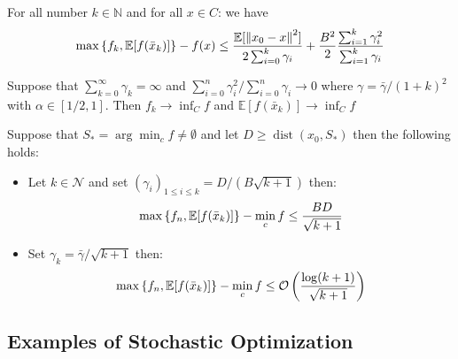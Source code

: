 \begin{theorem}
    For all number $k \in \mathbb{N}$ and for all $x\in C$: we have 
    \begin{equation*}
        \max\left\{ f_k, \mathbb{E}[f(\bar{x}_k)] \right\} - f(x) \le \frac{\mathbb{E}[\left\lVert x_0 - x\right\rVert^2]}{2\sum^k_{i=0}\gamma_i} +\frac{B^2}{2}\frac{\sum^k_{i=1}\gamma_i^2}{\sum^k_{i=1}\gamma_i}
    \end{equation*}
\end{theorem}

\begin{corollary}
    Suppose that $\sum^\infty_{k=0}\gamma_k=\infty$ and $\sum^n_{i=0}\gamma_i^2/\sum^n_{i=0}\gamma_i \rightarrow 0$  where $\gamma = \bar{\gamma}/(1+k)^2$ with $\alpha\in[1/2, 1]$. Then $f_k \rightarrow \inf_Cf$ and $\mathbb{E}[f(\bar{x}_k)]\rightarrow \inf_C f$
\end{corollary}

\begin{corollary}
    Suppose that $S_* = \arg\min_c f\ne\emptyset$ and let $D\ge\operatorname{dist}(x_0, S_*)$ then the following holds:
    \begin{itemize}
        \item Let $k\in\mathcal{N}$ and set $(\gamma_i)_{1\le i\le k} = D/(B\sqrt{k+1})$ then:
        \begin{equation*}
            \max\left\{ f_n, \mathbb{E}[f(\bar{x}_k)] \right\} - \min_c f \le \frac{BD}{\sqrt{k+1}}
        \end{equation*}
        \item Set $\gamma_k = \bar{\gamma}/\sqrt{k+1}$ then:
        \begin{equation*}
            \max\left\{ f_n, \mathbb{E}[f(\bar{x}_k)] \right\} - \min_c f \le \mathcal{O}\left( \frac{\log(k+1)}{\sqrt{k+1}} \right) 
        \end{equation*}
    \end{itemize}
\end{corollary}

\subsection{Examples of Stochastic Optimization}

